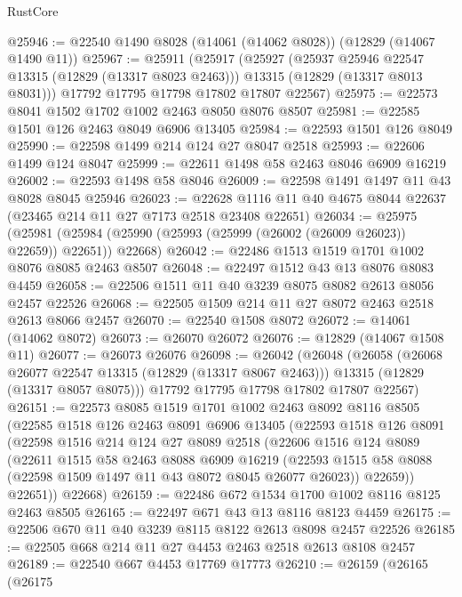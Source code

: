 \begin{lexlean}{RustCore}
\begin{coremodule}
@25946 := @22540 @1490 @8028 (@14061 (@14062 @8028)) (@12829 (@14067 @1490 @11))
@25967 := @25911
    (@25917
      (@25927
        (@25937 @25946 @22547 @13315 (@12829 (@13317 @8023 @2463)))
        @13315
        (@12829 (@13317 @8013 @8031)))
      @17792
      @17795
      @17798
      @17802
      @17807
      @22567)
@25975 := @22573 @8041 @1502 @1702 @1002 @2463 @8050 @8076 @8507
@25981 := @22585 @1501 @126 @2463 @8049 @6906 @13405
@25984 := @22593 @1501 @126 @8049
@25990 := @22598 @1499 @214 @124 @27 @8047 @2518
@25993 := @22606 @1499 @124 @8047
@25999 := @22611 @1498 @58 @2463 @8046 @6909 @16219
@26002 := @22593 @1498 @58 @8046
@26009 := @22598 @1491 @1497 @11 @43 @8028 @8045 @25946
@26023 := @22628 @1116 @11 @40 @4675 @8044 @22637 (@23465 @214 @11 @27 @7173 @2518 @23408 @22651)
@26034 := @25975
    (@25981 (@25984 (@25990 (@25993 (@25999 (@26002 (@26009 @26023)) @22659)) @22651)) @22668)
@26042 := @22486 @1513 @1519 @1701 @1002 @8076 @8085 @2463 @8507
@26048 := @22497 @1512 @43 @13 @8076 @8083 @4459
@26058 := @22506 @1511 @11 @40 @3239 @8075 @8082 @2613 @8056 @2457 @22526
@26068 := @22505 @1509 @214 @11 @27 @8072 @2463 @2518 @2613 @8066 @2457
@26070 := @22540 @1508 @8072
@26072 := @14061 (@14062 @8072)
@26073 := @26070 @26072
@26076 := @12829 (@14067 @1508 @11)
@26077 := @26073 @26076
@26098 := @26042
    (@26048
      (@26058
        (@26068 @26077 @22547 @13315 (@12829 (@13317 @8067 @2463)))
        @13315
        (@12829 (@13317 @8057 @8075)))
      @17792
      @17795
      @17798
      @17802
      @17807
      @22567)
@26151 := @22573
    @8085
    @1519
    @1701
    @1002
    @2463
    @8092
    @8116
    @8505
    (@22585
      @1518
      @126
      @2463
      @8091
      @6906
      @13405
      (@22593
        @1518
        @126
        @8091
        (@22598
          @1516
          @214
          @124
          @27
          @8089
          @2518
          (@22606
            @1516
            @124
            @8089
            (@22611
              @1515
              @58
              @2463
              @8088
              @6909
              @16219
              (@22593 @1515 @58 @8088 (@22598 @1509 @1497 @11 @43 @8072 @8045 @26077 @26023))
              @22659))
          @22651))
      @22668)
@26159 := @22486 @672 @1534 @1700 @1002 @8116 @8125 @2463 @8505
@26165 := @22497 @671 @43 @13 @8116 @8123 @4459
@26175 := @22506 @670 @11 @40 @3239 @8115 @8122 @2613 @8098 @2457 @22526
@26185 := @22505 @668 @214 @11 @27 @4453 @2463 @2518 @2613 @8108 @2457
@26189 := @22540 @667 @4453 @17769 @17773
@26210 := @26159
    (@26165
      (@26175

\end{coremodule}
\end{lexlean}
